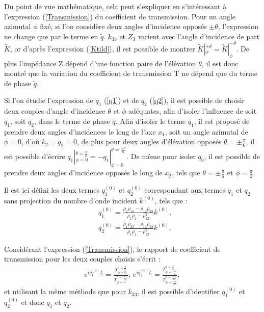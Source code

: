 \documentclass[12pt]{report}
\begin{document}
    Du point de vue mathématique, cela peut s'expliquer en s'intéressant à l'expression (\ref{Transmission}) du coefficient de transmission. Pour un angle azimutal $\phi$ fixé, si l'on considère deux angles d'incidence opposés $\pm \theta$, l'expression ne change que par le terme en $\tilde{q}$. $k_{33}$ et $Z_3$ varient avec l'angle d'incidence de part $\tilde{K}$, or d'après l'expression (\ref{Ktild}), il est possible de montrer $\tilde{K}|^{+\theta}_{\phi}=\tilde{K}|^{-\theta}_{\phi}$. De plus l'impédance Z dépend d'une fonction paire de l'élévation $\theta$, il est donc montré que la variation du coefficient de transmission T ne dépend que du terme de phase $\tilde{q}$.
    
    Si l'on étudie l'expression de $q_1$ (\ref{q1}) et de $q_2$ (\ref{q2}), il est possible de choisir deux couples d'angle d'incidence $\theta$ et $\phi$ adéquates, afin d'isoler l'influence de soit $q_1$, soit $q_2$, dans le terme de phase $\tilde{q}$. Afin d'isoler le terme $q_1$, il est proposé de prendre deux angles d'incidences le long de l'axe $x_1$, soit un angle azimutal de $\phi=0$, d'où $k_2=q_2=0$, de plus pour deux angles d'élévation opposés $\theta=\pm \frac{\pi}{6}$, il est possible d'écrire $q_1|^{\theta=\frac{\pi}{6}}_{\phi=0}=-q_1|^{\theta=\frac{-\pi}{6}}_{\phi=0}$. De même pour isoler $q_2$, il est possible de prendre deux angles d'incidence opposés le long de $x_2$, tels que $\theta=\pm \frac{\pi}{6}$ et $\phi=\frac{\pi}{2}$.
    
    Il est ici défini les deux termes $q_1^{(0)}$ et $q_2^{(0)}$ correspondant aux termes $q_1$ et $q_2$ sans projection du nombre d'onde incident $k^{(0)}$, tels que :
    \begin{align}
            &q_1^{(0)}=\frac{\rho_2\rho_{13}-\rho_{12}\rho_{23}}{\rho_1\rho_2-\rho_{12}^2}k^{(0)},\label{q1,0}\\
        &q_2^{(0)}=\frac{\rho_1\rho_{23}-\rho_{12}\rho_{13}}{\rho_1\rho_2-\rho_{12}^2}k^{(0)}.\label{q2,0}
    \end{align}
    
    Considérant l'expression (\ref{Transmission}), le rapport de coefficient de transmission pour les deux couples choisis s'écrit :
    \begin{align}
     e^{iq_1^{(0)}L}=\frac{T^{\theta=\frac{\pi}{6}}_{\phi=0}}{T^{\theta=\frac{-\pi}{6}}_{\phi=0}},\ e^{iq_2^{(0)}L}=\frac{T^{\theta=\frac{\pi}{6}}_{\phi=\frac{-\pi}{2}}}{T^{\theta=\frac{-\pi}{6}}_{\phi=\frac{-\pi}{2}}},
    \end{align}
    et utilisant la même méthode que pour $k_{33}$, il est possible d'identifier $q_1^{(0)}$ et $q_2^{(0)}$ et donc $q_1$ et $q_2$.
    
\end{document}
